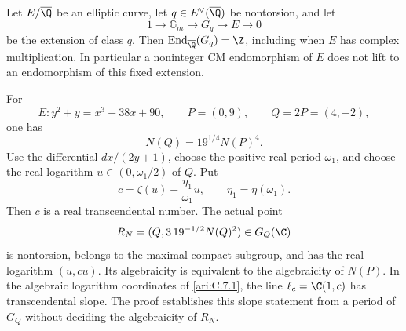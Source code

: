 \begin{proposition}\label{ari:C.7.9}
Let $E/\overline\Q$ be an elliptic curve, let
$q\in E^\vee(\overline\Q)$ be nontorsion, and let
\[
 1\longrightarrow\mathbb G_m\longrightarrow G_q
       \longrightarrow E\longrightarrow0
\]
be the extension of class $q$. Then
$\operatorname{End}_{\overline\Q}(G_q)=\Z$, including when
$E$ has complex multiplication. In particular a noninteger
CM endomorphism of $E$ does not lift to an endomorphism of this
fixed extension.

For
\[
 E:y^2+y=x^3-38x+90,\qquad P=(0,9),\qquad Q=2P=(4,-2),
\]
one has
\[
 N(Q)=19^{1/4}N(P)^4.
\]
Use the differential $dx/(2y+1)$, choose the positive real
period $\omega_1$, and choose the real logarithm
$u\in(0,\omega_1/2)$ of $Q$. Put
\begin{equation}\label{ari:eq:cd-slope}
 c=\zeta(u)-\frac{\eta_1}{\omega_1}u,
 \qquad \eta_1=\eta(\omega_1).
\end{equation}
Then $c$ is a real transcendental number. The actual point
\[
 R_N=(Q,3\,19^{-1/2}N(Q)^2)\in G_Q(\C)
\]
is nontorsion, belongs to the maximal compact subgroup, and has
the real logarithm $(u,cu)$. Its algebraicity is equivalent to
the algebraicity of $N(P)$. In the algebraic logarithm coordinates
of \ref{ari:C.7.1}, the line $\ell_c=\C(1,c)$ has transcendental
slope. The proof establishes this slope statement from a period
of $G_Q$ without deciding the algebraicity of $R_N$.
\end{proposition}

